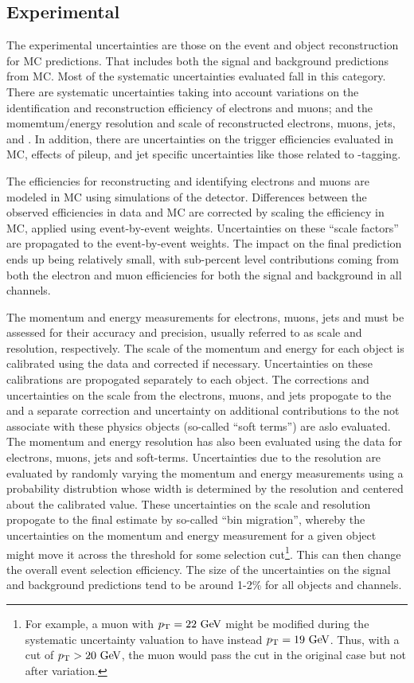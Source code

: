 \subsection{Experimental}
The experimental uncertainties are those on the event and object
reconstruction for MC predictions.  That includes both the signal
and background predictions from MC.
Most of the systematic uncertainties evaluated fall in this category.
There are systematic uncertainties taking into account variations
on the identification and reconstruction
efficiency of electrons and muons; and 
the momemtum/energy resolution and scale of reconstructed electrons, muons,
jets, and \MET. In addition, there are uncertainties on the trigger
efficiencies evaluated in MC, effects of pileup, and jet specific uncertainties
like those related to \bee-tagging.

The efficiencies for reconstructing and identifying electrons and muons
are modeled in MC using simulations of the detector. Differences
between the observed efficiencies in data and MC are corrected by scaling
the efficiency in MC, applied using event-by-event weights. 
Uncertainties on these ``scale factors'' are propagated to the event-by-event
weights.  The impact on the final prediction ends up being relatively
small, with sub-percent level contributions coming from both the electron
and muon efficiencies for both the signal and background in all channels.

The momentum and energy measurements for electrons, muons, jets and \MET
must be assessed for their accuracy and precision, usually referred to
as scale and resolution, respectively. The scale of the momentum and energy 
for each object is calibrated using the data and corrected if necessary.
Uncertainties on these calibrations are propogated separately to each object.
The corrections and uncertainties on the scale
from the electrons, muons, and jets propogate to the \MET and a separate
correction and uncertainty on additional contributions to the \MET
not associate with these physics objects (so-called ``soft terms'')
are aslo evaluated. 
The momentum and energy resolution has also been evaluated using the data
for electrons, muons, jets and \MET soft-terms.  Uncertainties due to the
resolution are evaluated by randomly varying the momentum and energy measurements
using a probability distrubtion whose width is determined by the resolution
and centered about the calibrated value. These uncertainties on the scale
and resolution propogate to the final estimate by so-called ``bin migration'',
whereby the uncertainties on the momentum and energy measurement 
for a given object might move it across the threshold for some 
selection cut\footnote{For example, a muon with $\pt = 22 \GeV$ might
be modified during the systematic uncertainty valuation to have instead
$\pt = 19 \GeV$. Thus, with a cut of $\pt > 20 \GeV$, the muon would pass the
cut in the original case but not after variation.}. This can 
then change the overall event selection efficiency. The size of the uncertainties
on the signal and background predictions tend to be around 1-2\% for
all objects and channels.



